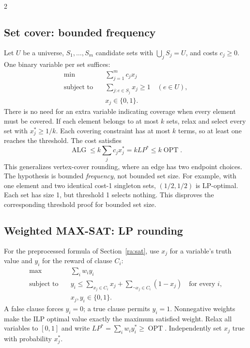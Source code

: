 \documentclass[8pt]{extarticle}
\theoremstyle{definition}
\newcommand{\OPT}{\operatorname{OPT}}
\newcommand{\ALG}{\operatorname{ALG}}
\begin{document}
\begin{multicols*}{2}
\subsection{Set cover: bounded frequency}\label{lp:cover}
Let $U$ be a universe, $S_1,\ldots,S_m$ candidate sets with
$\bigcup_jS_j=U$, and costs $c_j\ge0$. One binary variable per set suffices:
\[
\begin{aligned}
  \min\quad &\sum_{j=1}^m c_jx_j\\
  \text{subject to}\quad &\sum_{j:e\in S_j}x_j\ge1\quad(e\in U),\\
  &x_j\in\{0,1\}.
\end{aligned}
\]
There is no need for an extra variable indicating coverage when every
element must be covered. If each element belongs to at most $k$ sets,
relax and select every set with $x_j^*\ge1/k$. Each covering constraint has
at most $k$ terms, so at least one reaches the threshold. The cost satisfies
\[
  \ALG\le k\sum_jc_jx_j^*=kLP^*\le k\OPT.
\]
This generalizes vertex-cover rounding, where an edge has two endpoint
choices. The hypothesis is bounded \emph{frequency}, not bounded set size.
For example, with one element and two identical cost-1 singleton sets,
$(1/2,1/2)$ is LP-optimal. Each set has size 1, but threshold 1 selects
nothing. This disproves the corresponding threshold proof for bounded set
size.

\subsection{Weighted MAX-SAT: LP rounding}\label{lp:sat}
For the preprocessed formula of Section~\ref{ra:sat}, use $x_j$ for a
variable's truth value and $y_i$ for the reward of clause $C_i$:
\[
  \begin{aligned}
    \max\quad &\sum_iw_i y_i\\
    \text{subject to}\quad &
      y_i\le\sum_{x_j\in C_i}x_j+
             \sum_{\neg x_j\in C_i}(1-x_j)\quad\text{for every }i,\\
    &x_j,y_i\in\{0,1\}.
  \end{aligned}
\]
A false clause forces $y_i=0$; a true clause permits $y_i=1$.
Nonnegative weights make the ILP optimal value exactly the maximum
satisfied weight. Relax all variables to $[0,1]$ and write
$LP^*=\sum_iw_i y_i^*\ge\OPT$.
Independently set $x_j$ true with probability $x_j^*$.


\end{multicols*}
\end{document}
